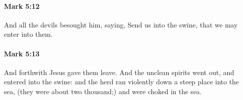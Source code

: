 		\paragraph{Mark 5:12} %
			\label{MARK-5-12}

			And all the devils besought him, saying, Send us into the swine, that we may enter into them.

			\begin{framed}
			\scriptsize
				\begin{compactdesc}
					\item[SBLG] 
				\end{compactdesc}
			\end{framed}

		\paragraph{Mark 5:13} %
			\label{MARK-5-13}

			And forthwith Jesus gave them leave. And the unclean spirits went out, and entered into the swine: and the herd ran violently down a steep place into the sea, (they were about two thousand;) and were choked in the sea.

